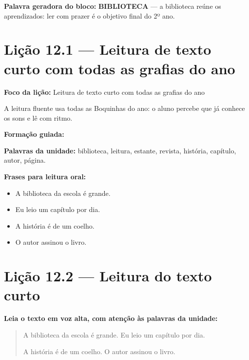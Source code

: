 \textbf{Palavra geradora do bloco:} \textbf{BIBLIOTECA} --- a biblioteca reúne os aprendizados: ler com prazer é o objetivo final do 2º ano.

\section{Lição 12.1 --- Leitura de texto curto com todas as grafias do ano}

\textbf{Foco da lição:} Leitura de texto curto com todas as grafias do ano


\begin{boquinha}
A leitura fluente usa todas as Boquinhas do ano: o aluno percebe que já conhece os sons e lê com ritmo.
\end{boquinha}

\noindent\textbf{Formação guiada:}

\begin{center}
\end{center}

\noindent\textbf{Palavras da unidade:} biblioteca, leitura, estante, revista, história, capítulo, autor, página.

\noindent\textbf{Frases para leitura oral:}
\begin{itemize}[leftmargin=1.6em]
  \item A biblioteca da escola é grande.
  \item Eu leio um capítulo por dia.
  \item A história é de um coelho.
  \item O autor assinou o livro.
\end{itemize}

\section{Lição 12.2 --- Leitura do texto curto}

\noindent\textbf{Leia o texto em voz alta, com atenção às palavras da unidade:}


\begin{quote}
A biblioteca da escola é grande. Eu leio um capítulo por dia.

A história é de um coelho. O autor assinou o livro.
\end{quote}

